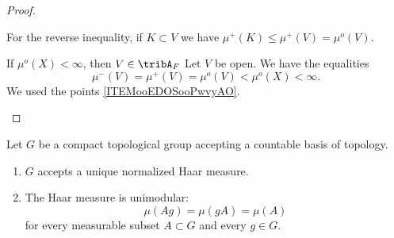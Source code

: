 \begin{proof}
\begin{subproof}
        For the reverse inequality, if \( K\subset V\) we have \( \mu^+(K)\leq \mu^+(V)=\mu^o(V)\).
    \item[If \( \mu^o(X)<\infty\), then \( V\in \tribA_F\)]
        Let \( V\) be open. We have the equalities
        \begin{equation}
            \mu^-(V)=\mu^+(V)=\mu^o(V)<\mu^o(X)<\infty.
        \end{equation}
        We used the points \ref{ITEMooEDOSooPwvyAO}.
    \end{subproof}
\end{proof}


\begin{theorem} \label{ThoBZBooOTxqcI}
    Let \( G\) be a compact topological group accepting a countable basis of topology.
    \begin{enumerate}
        \item
            \( G\) accepts a unique normalized Haar measure.
        \item
            The Haar measure is unimodular:
	\begin{equation}
		\mu(Ag)=\mu(gA)=\mu(A)
	\end{equation}
    for every measurable subset \( A\subset G\) and every \( g\in G\).
    \end{enumerate}
\end{theorem}


